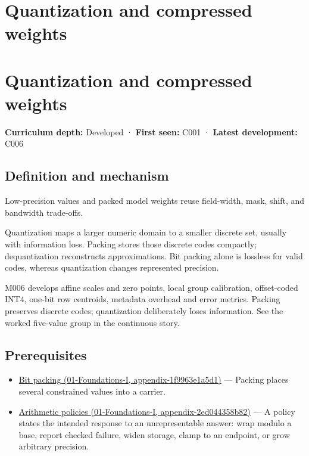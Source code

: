 \hypertarget{appendix-fdc7879e8bf2}{}
\section*{Quantization and compressed weights}
\section{Quantization and compressed weights}\label{appendix-fdc7879e8bf2-quantization-and-compressed-weights}

\textbf{Curriculum depth:} Developed · \textbf{First seen:} C001 · \textbf{Latest development:} C006

\subsection{Definition and mechanism}\label{appendix-fdc7879e8bf2-definition-and-mechanism}

Low-precision values and packed model weights reuse field-width, mask, shift, and bandwidth trade-offs.

Quantization maps a larger numeric domain to a smaller discrete set, usually with information loss. Packing stores those discrete codes compactly; dequantization reconstructs approximations. Bit packing alone is lossless for valid codes, whereas quantization changes represented precision.

M006 develops affine scales and zero points, local group calibration, offset-coded INT4, one-bit row centroids, metadata overhead and error metrics. Packing preserves discrete codes; quantization deliberately loses information. See the worked five-value group in the continuous story.

\subsection{Prerequisites}\label{appendix-fdc7879e8bf2-prerequisites}

\begin{itemize}
\tightlist
\item
  \href{../01-Foundations-I/main.pdf\#nameddest=appendix-1f9963e1a5d1}{Bit packing (01-Foundations-I, appendix-1f9963e1a5d1)} --- Packing places several constrained values into a carrier.
\item
  \href{../01-Foundations-I/main.pdf\#nameddest=appendix-2ed044358b82}{Arithmetic policies (01-Foundations-I, appendix-2ed044358b82)} --- A policy states the intended response to an unrepresentable answer: wrap modulo a base, report checked failure, widen storage, clamp to an endpoint, or grow arbitrary precision.
\end{itemize}


